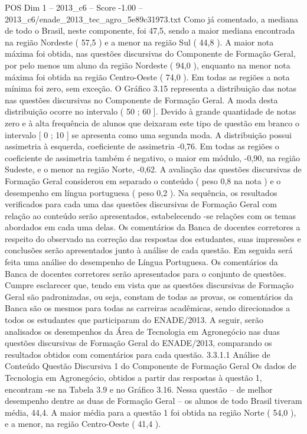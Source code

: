 \begin{textsample}{POS Dim 1 – 2013\_c6 – Score -1.00 – 2013\_c6/enade\_2013\_tec\_agro\_5e89c31973.txt}
Como já comentado, a mediana de todo o Brasil, neste componente, foi 47,5, sendo a maior mediana encontrada na região Nordeste ( 57,5 ) e a menor na região Sul ( 44,8 ).
A maior nota máxima foi obtida, nas questões discursivas do Componente de Formação Geral, por pelo menos um aluno da região Nordeste ( 94,0 ), enquanto na menor nota máxima foi obtida na região Centro-Oeste ( 74,0 ).
Em todas as regiões a nota mínima foi zero, sem exceção.
O Gráfico 3.15 representa a distribuição das notas nas questões discursivas no Componente de Formação Geral.
A moda desta distribuição ocorre no intervalo ( 50 ; 60 ].
Devido à grande quantidade de notas zero e à alta frequência de alunos que deixaram este tipo de questão em branco o intervalo [ 0 ; 10 ] se apresenta como uma segunda moda.
A distribuição possui assimetria à esquerda, coeficiente de assimetria -0,76.
Em todas as regiões o coeficiente de assimetria também é negativo, o maior em módulo, -0,90, na região Sudeste, e o menor na região Norte, -0,62.
A avaliação das questões discursivas de Formação Geral considerou em separado o conteúdo ( peso 0,8 na nota ) e o desempenho em língua portuguesa ( peso 0,2 ).
Na sequência, os resultados verificados para cada uma das questões discursivas de Formação Geral com relação ao conteúdo serão apresentados, estabelecendo -se relações com os temas abordados em cada uma delas.
Os comentários da Banca de docentes corretores a respeito do observado na correção das respostas dos estudantes, suas impressões e conclusões serão apresentados junto à análise de cada questão.
Em seguida será feita uma análise do desempenho de Língua Portuguesa.
Os comentários da Banca de docentes corretores serão apresentados para o conjunto de questões.
Cumpre esclarecer que, tendo em vista que as questões discursivas de Formação Geral são padronizadas, ou seja, constam de todas as provas, os comentários da Banca são os mesmos para todas as carreiras acadêmicas, sendo direcionados a todos os estudantes que participaram do ENADE/2013.
A seguir, serão analisados os desempenhos da Área de Tecnologia em Agronegócio nas duas questões discursivas de Formação Geral do ENADE/2013, comparando os resultados obtidos com comentários para cada questão. 3.3.1.1 Análise de Conteúdo Questão Discursiva 1 do Componente de Formação Geral Os dados de Tecnologia em Agronegócio, obtidos a partir das respostas à questão 1, encontram -se na Tabela 3.9 e no Gráfico 3.16.
Nessa questão – de melhor desempenho dentre as duas de Formação Geral – os alunos de todo Brasil tiveram média, 44,4.
A maior média para a questão 1 foi obtida na região Norte ( 54,0 ), e a menor, na região Centro-Oeste ( 41,4 ).

\end{textsample}
